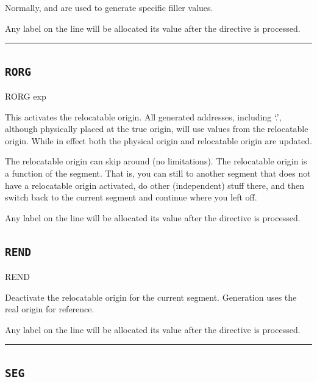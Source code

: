 Normally,  and  are used to generate specific filler
values.

Any label on the  line will be allocated its value after the directive is processed.\\

\hrule



\subsection{\texttt{RORG}}
\label{pseudoop:rorg}

\begin{usage}
  RORG exp
\end{usage}

This activates the relocatable origin.  All generated
addresses, including `.', although physically placed at the
true origin, will use values from the relocatable origin.
While in effect both the physical origin and relocatable origin
are updated.

The relocatable origin can skip around (no limitations).  The
relocatable origin is a function of the segment.  That is, you
can still  to another segment that does not have a
relocatable origin activated, do other (independent) stuff
there, and then switch back to the current segment and continue
where you left off.

Any label on the  line will be allocated its value after the directive is processed.


\subsection{\texttt{REND}}
\label{pseudoop:rend}

\begin{usage}
  REND
\end{usage}


Deactivate the relocatable origin for the current segment.
Generation uses the real origin for reference.

Any label on the  line will be allocated its value after the directive is processed.\\

\hrule



\subsection{\texttt{SEG}}
\label{pseudoop:seg}


